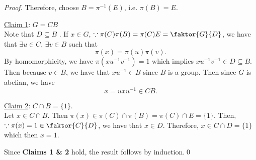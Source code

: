 \begin{proof}
  Therefore, choose $B = \pi^{-1} (E)$, i.e. $\pi(B) = E$.

  \noindent\underline{Claim 1}: $G = CB$ \\
  Note that $D \subseteq B$ . If $x \in G$, $\because \pi(C) \pi(B) = \pi(C) E = \faktor{G}{D}$, we have that $\exists u \in C, \, \exists v \in B$ such that
  \begin{equation*}
    \pi(x) = \pi(u)\pi(v).
  \end{equation*}
  By homomorphicity, we have $\pi(xu^{-1}v^{-1}) = 1$ which implies $xu^{-1}v^{-1} \in D \subseteq B$. Then because $v \in B$, we have that $xu^{-1} \in B$ since $B$ is a group. Then since $G$ is abelian, we have
  \begin{equation*}
    x = u x u^{-1} \in CB.
  \end{equation*}

  \noindent\underline{Claim 2}: $C \cap B = \{1\}$. \\
  Let $x \in C \cap B$. Then $\pi(x) \in \pi(C) \cap \pi(B) = \pi(C) \cap E = \{1\}$. Then, $\because \pi(x) = 1 \in \faktor{C}{D}$, we have that $x \in D$. Therefore, $x \in C \cap D = \{1\}$ which then $x = 1$.

  Since \textbf{Claims 1 \& 2} hold, the result follows by induction.\qed 
\end{proof}




